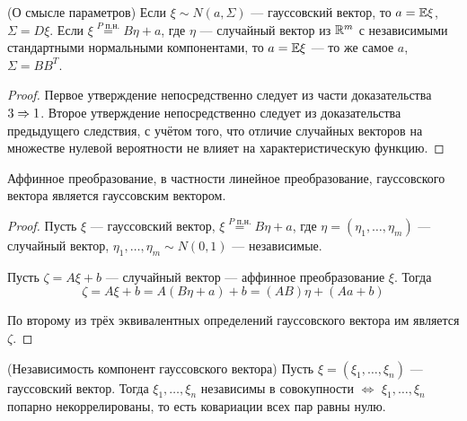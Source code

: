 \begin{corollary} (О смысле параметров)
    Если $\xi \sim N(a, \Sigma)$ --- гауссовский вектор, то $a = \mathbb{E}\xi$, $\Sigma = D\xi$. Если $\xi \stackrel{P\text{ п.н.}}{=} B\eta + a$, где $\eta$ --- случайный вектор из $\mathbb{R}^m$ с независимыми стандартными нормальными компонентами, то $a = \mathbb{E}\xi$ --- то же самое $a$, $\Sigma = B B^T$.
\end{corollary}

\begin{proof}
    Первое утверждение непосредственно следует из части доказательства $3 \Rightarrow 1$. Второе утверждение непосредственно следует из доказательства предыдущего следствия, с учётом того, что отличие случайных векторов на множестве нулевой вероятности не влияет на характеристическую функцию.
\end{proof}

\begin{corollary}
    Аффинное преобразование, в частности линейное преобразование, гауссовского вектора является гауссовским вектором.
\end{corollary}

\begin{proof}
    Пусть $\xi$ --- гауссовский вектор, $\xi \stackrel{P\text{ п.н.}}{=} B\eta + a$, где $\eta = (\eta_1, \ldots, \eta_m)$ --- случайный вектор, $\eta_1, \ldots, \eta_m \sim N(0, 1)$ --- независимые.
    
    Пусть $\zeta = A \xi + b$ --- случайный вектор --- аффинное преобразование $\xi$. Тогда
    \[
        \zeta = A \xi + b = A (B\eta + a) + b = (AB)\eta +(Aa + b)
    \]

    По второму из трёх эквивалентных определений гауссовского вектора им является $\zeta$.
\end{proof}

\begin{corollary} (Независимость компонент гауссовского вектора)
    Пусть $\xi = (\xi_1, \ldots, \xi_n)$ --- гауссовский вектор. Тогда $\xi_1, \ldots, \xi_n$ независимы в совокупности $\Leftrightarrow$ $\xi_1, \ldots, \xi_n$ попарно некоррелированы, то есть ковариации всех пар равны нулю.
\end{corollary}

